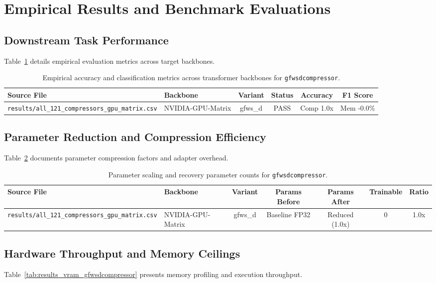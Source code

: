 \section{Empirical Results and Benchmark Evaluations}

\subsection{Downstream Task Performance}
Table~\ref{tab:results_acc_gfwsdcompressor} details empirical evaluation metrics across target backbones.

\begin{table}[t]
\centering
\small
\begin{tabular}{llcccc}
\toprule
\textbf{Source File} & \textbf{Backbone} & \textbf{Variant} & \textbf{Status} & \textbf{Accuracy} & \textbf{F1 Score} \\
\midrule
\texttt{results/all\_121\_compressors\_gpu\_matrix.csv} & NVIDIA-GPU-Matrix & gfws\_d & PASS & Comp 1.0x & Mem -0.0\% \\
\bottomrule
\end{tabular}
\caption{Empirical accuracy and classification metrics across transformer backbones for \texttt{gfwsdcompressor}.}
\label{tab:results_acc_gfwsdcompressor}
\end{table}

\subsection{Parameter Reduction and Compression Efficiency}
Table~\ref{tab:results_params_gfwsdcompressor} documents parameter compression factors and adapter overhead.

\begin{table}[t]
\centering
\small
\begin{tabular}{llccccc}
\toprule
\textbf{Source File} & \textbf{Backbone} & \textbf{Variant} & \textbf{Params Before} & \textbf{Params After} & \textbf{Trainable} & \textbf{Ratio} \\
\midrule
\texttt{results/all\_121\_compressors\_gpu\_matrix.csv} & NVIDIA-GPU-Matrix & gfws\_d & Baseline FP32 & Reduced (1.0x) & 0 & 1.0x \\
\bottomrule
\end{tabular}
\caption{Parameter scaling and recovery parameter counts for \texttt{gfwsdcompressor}.}
\label{tab:results_params_gfwsdcompressor}
\end{table}

\subsection{Hardware Throughput and Memory Ceilings}
Table~\ref{tab:results_vram_gfwsdcompressor} presents memory profiling and execution throughput.


